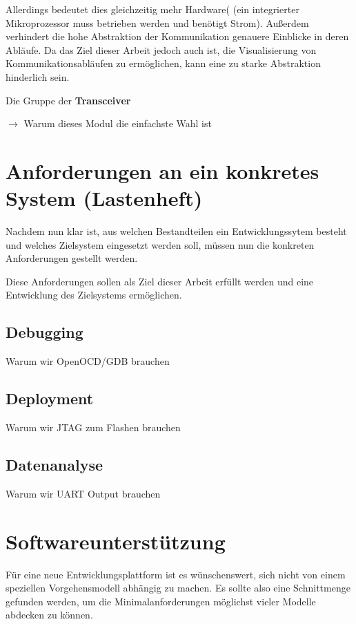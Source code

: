 Allerdings bedeutet dies gleichzeitig mehr Hardware( (ein integrierter
Mikroprozessor muss betrieben werden und benötigt Strom).
Außerdem verhindert die hohe Abstraktion der Kommunikation genauere Einblicke in
deren Abläufe. Da das Ziel dieser Arbeit jedoch auch ist, die Visualisierung von
Kommunikationsabläufen zu ermöglichen, kann eine zu starke Abstraktion
hinderlich sein.


Die Gruppe der \textbf{Transceiver}

 $\rightarrow$ Warum dieses Modul die einfachste Wahl
ist
\section{Anforderungen an ein konkretes System (Lastenheft)}
Nachdem nun klar ist, aus welchen Bestandteilen ein Entwicklungssytem besteht
und welches Zielsystem eingesetzt werden soll, müssen nun die
konkreten Anforderungen gestellt werden.

Diese Anforderungen sollen als Ziel dieser Arbeit erfüllt werden und eine
Entwicklung des Zielsystems ermöglichen.

\subsection{Debugging} Warum wir OpenOCD/GDB
brauchen 
\subsection{Deployment} Warum wir JTAG zum Flashen brauchen
\subsection{Datenanalyse} Warum wir UART Output brauchen





\iffalse

\section{Softwareunterstützung}
Für eine neue Entwicklungsplattform ist es wünschenswert, sich nicht von einem
speziellen Vorgehensmodell abhängig zu machen. Es sollte also eine Schnittmenge
gefunden werden, um die Minimalanforderungen möglichst vieler Modelle abdecken
zu können.


